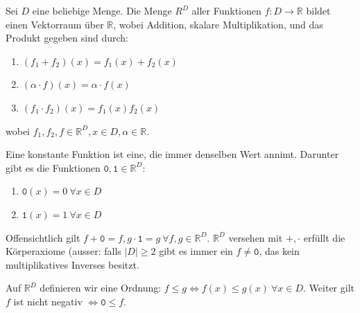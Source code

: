 Sei $D$ eine beliebige Menge. Die Menge $R^D$ aller Funktionen $f:D\rightarrow \mathbb{R}$ bildet einen Vektorraum über $\mathbb{R}$, wobei Addition, skalare Multiplikation, und das Produkt gegeben sind durch: 
\begin{enumerate}
    \item $(f_1+f_2)(x)=f_1(x)+f_2(x)$
    \item $(\alpha \cdot f)(x)=\alpha \cdot f(x)$
    \item $(f_1\cdot f_2)(x)=f_1(x)f_2(x)$
\end{enumerate}
wobei $f_1,f_2,f\in\mathbb{R}^D,x\in D,\alpha\in\mathbb{R}$.

Eine konstante Funktion ist eine, die immer denselben Wert annimt. Darunter gibt es die Funktionen $\mathtt{0},\mathtt{1}\in\mathbb{R}^D$:
\begin{enumerate}
    \item $\mathtt{0}(x)=0\ \forall x\in D$
    \item $\mathtt{1}(x)=1\ \forall x\in D$
\end{enumerate}
Offensichtlich gilt $f+\mathtt{0}=f,g\cdot\mathtt{1}=g\ \forall f,g\in\mathbb{R}^D$. $\mathbb{R}^D$ versehen mit $+,\cdot$ erfüllt die Körperaxiome (ausser: falls $|D|\geq 2$ gibt es immer ein $f\not = \mathtt{0}$, das kein multiplikatives Inverses besitzt.

Auf $\mathbb{R}^D$ definieren wir eine Ordnung: $f\leq g \Leftrightarrow f(x)\leq g(x)\ \forall x\in D$. Weiter gilt $f$ ist nicht negativ $\Leftrightarrow \mathtt{0}\leq f$.



